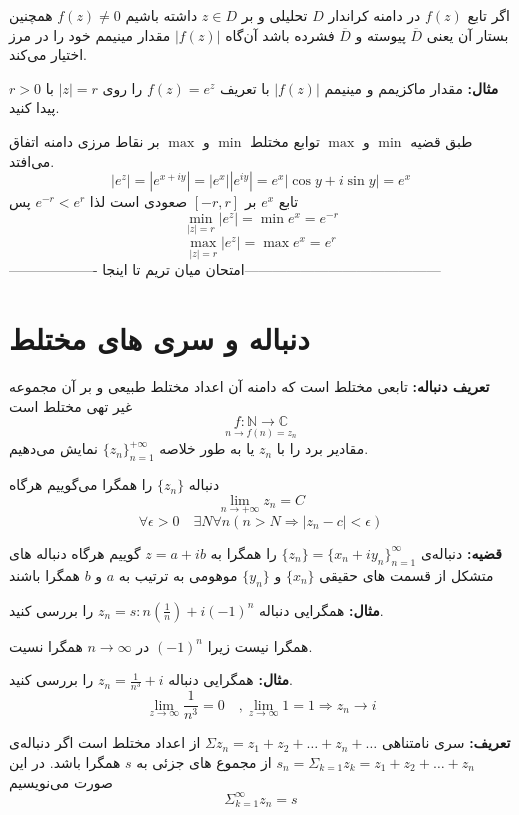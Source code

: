 \documentclass[12pt]{report}
\begin{document}
	اگر تابع 
	$f(z)$
	در دامنه کراندار
	$D$
	تحلیلی و بر 
	$z \in D$
	داشته باشیم
	$f(z) \neq 0$
	همچنین بستار آن یعنی
	$\overline{D}$
	پیوسته و 
	$\overline{D}$
	فشرده باشد آن‌گاه
	$|f(z)|$
	مقدار مینیمم خود را در مرز اختیار می‌کند.
	\newline
	
	\textbf{مثال:}
	مقدار ماکزیمم و مینیمم 
	$|f(z)|$
	با تعریف 
	$f(z) = e^z$
	را روی 
	$|z| = r$
	با 
	$r > 0$
	پیدا کنید.
	
	طبق قضیه 
	$\min$
	و 
	$\max$
	توابع مختلط
	$\min$
	و 
	$\max$
	بر نقاط مرزی دامنه اتفاق می‌افتد.
	$$|e^z| = |e^{x + iy}| = |e^x||e^{iy}| = e^x|\cos y + i\sin y| = e^x$$
	تابع 
	$e^x$
	بر 
	$[-r, r]$
	صعودی است لذا
	$e^{-r} < e^r$
	پس
	$$\min_{|z| = r} |e^z| = \min e^x = e^{-r}$$
	$$\max_{|z| = r} |e^z| = \max e^x = e^{r}$$
	------------------- امتحان میان تریم تا اینجا------------------------------------------
	\chapter{دنباله و سری های مختلط}
	
	\textbf{تعریف دنباله:}
	تابعی مختلط است که دامنه آن اعداد مختلط طبیعی و بر آن مجموعه غیر تهی مختلط است
	$$ \underset{n \to f(n) = z_n}{f: \mathbb{N} \to \mathbb{C}}$$
	مقادیر برد را با 
	$z_n$
	یا به طور خلاصه 
	$\{z_n\}_{n =1}^{+\infty}$
	نمایش می‌دهیم.
	
	دنباله 
	$\{z_n\}$
	را همگرا می‌گوییم هرگاه
	$$\lim_{n \to +\infty} z_n = C$$
	$$\forall \epsilon > 0 \quad\exists N \forall n(n > N \Rightarrow |z_n - c| < \epsilon)$$
	\newline
	
	\textbf{قضیه:}
	دنباله‌ی
	$\{z_n\} = \{x_n + i y_n\}_{n  = 1}^{\infty}$
	را همگرا به 
	$z = a + ib$
	گوییم هرگاه دنباله های متشکل از قسمت های حقیقی
	$\{x_n\}$
	و
	$\{y_n\}$
	موهومی به ترتیب به
	$a$
	و
	$b$
	همگرا باشند
	\newline
	
	\textbf{مثال:}
	همگرایی دنباله
	$z_n = s : n (\frac{1}{n}) + i(-1)^n$
	را بررسی کنید.
	
	همگرا نیست زیرا
	$(-1)^n$
	در 
	$n \to \infty$
	همگرا نسیت.
	\newline
	
	\textbf{مثال:}
	همگرایی دنباله 
	$z_n = \frac{1}{n^3} + i$
	را بررسی کنید.
	$$\lim_{z \to \infty} \frac{1}{n^3} = 0 \quad , \lim_{z \to \infty} 1 = 1 \Rightarrow z_n \to i$$
	\newline
	
	\textbf{تعریف:}
	سری نامتناهی
	$\Sigma z_n = z_1 + z_2 +\dots + z_n + \dots$
	از اعداد مختلط است اگر دنباله‌ی
	$s_n = \Sigma_{k = 1} z_k =z_1 + z_2 +\dots + z_n $
	از مجموع های جزئی به 
	$s$
	همگرا باشد. در این صورت می‌نویسیم
	$$\Sigma_{k = 1}^{\infty} z_n = s$$
	\newline
	
\end{document}
